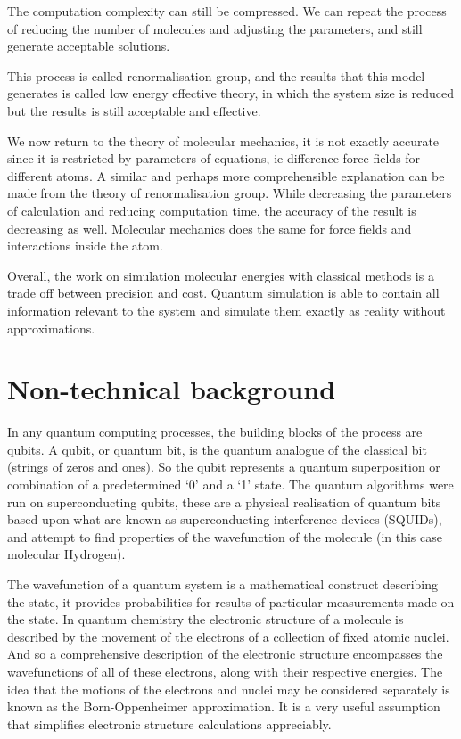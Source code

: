\documentclass[12pt]{article}
\begin{document}
The computation complexity can still be compressed. We can repeat the process of reducing the number of molecules and adjusting the parameters, and still generate acceptable solutions.

This process is called renormalisation group, and the results that this model generates is called low energy effective theory, in which the system size is reduced but the results is still acceptable and effective.

We now return to the theory of molecular mechanics, it is not exactly accurate since it is restricted by parameters of equations, ie difference force fields for different atoms. A similar and perhaps more comprehensible explanation can be made from the theory of renormalisation group. While decreasing the parameters of calculation and reducing computation time, the accuracy of the result is decreasing as well. Molecular mechanics does the same for force fields and interactions inside the atom.

Overall, the work on simulation molecular energies with classical methods is a trade off between precision and cost. Quantum simulation is able to contain all information relevant to the system and simulate them exactly as reality without approximations.


\section{Non-technical background}
In any quantum computing processes, the building blocks of the process are qubits. A qubit, or quantum bit, is the quantum analogue of the classical bit (strings of zeros and ones). So the qubit represents a quantum superposition or combination of a predetermined ‘0’ and a ‘1’ state. The quantum algorithms were run on superconducting qubits, these are a physical realisation of quantum bits based upon what are known as superconducting interference devices (SQUIDs), and attempt to find properties of the wavefunction of the molecule (in this case molecular Hydrogen).

The wavefunction of a quantum system is a mathematical construct describing the state, it provides probabilities for results of particular measurements made on the state. In quantum chemistry the electronic structure of a molecule is described by the movement of the electrons of a collection of fixed atomic nuclei. And so a comprehensive description of the electronic structure encompasses the wavefunctions of all of these electrons, along with their respective energies. The idea that the motions of the electrons and nuclei may be considered separately is known as the Born-Oppenheimer approximation. It is a very useful assumption that simplifies electronic structure calculations appreciably.
\end{document}
